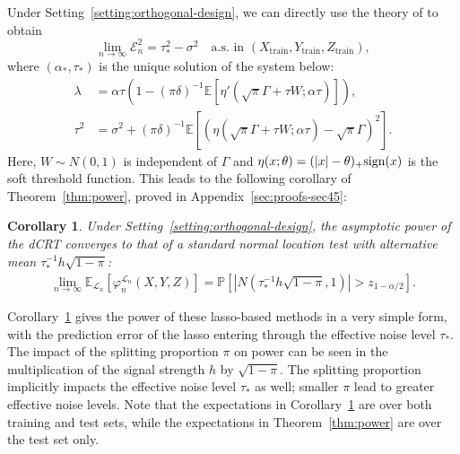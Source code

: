 \documentclass[ejs]{imsart}
\numberwithin{equation}{section}
\theoremstyle{plain}
\newtheorem{corollary}{Corollary}
\theoremstyle{definition}
\theoremstyle{remark}
\newcommand{\srx}{X}
\newcommand{\srz}{Z}
\newcommand{\sry}{Y}
\begin{document}
Under Setting~\ref{setting:orthogonal-design}, we can directly use the theory of \cite{Bayati2011} to obtain 
\begin{equation}
\lim_{n \rightarrow \infty}\mathcal E_n^2 = \tau_*^2 - \sigma^2 \quad \text{a.s. in } (\srx_{\text{train}}, \sry_{\text{train}}, \srz_{\text{train}}),
\label{eq:bm-result}
\end{equation}
where $(\alpha_*,\tau_*)$ is the unique solution of the system below:
\begin{equation}
	\begin{split}
		\lambda &= \alpha \tau (1-(\pi\delta)^{-1}\mathbb E[\eta'(\sqrt \pi \Gamma + \tau W; \alpha \tau)]), \\
		\tau^2 &= \sigma^2 + (\pi\delta)^{-1}\mathbb E[(\eta(\sqrt \pi\Gamma + \tau W; \alpha \tau) - \sqrt \pi\Gamma)^2].
	\end{split}
	\label{eq:amp-system}
\end{equation}
Here, $W \sim N(0,1)$ is independent of $\Gamma$ and $\eta(x; \theta) = (|x|-\theta)_+\textnormal{sign}(x)$ is the soft threshold function. This leads to the following corollary of Theorem~\ref{thm:power}, proved in Appendix~\ref{sec:proofs-sec45}:
\begin{corollary} \label{cor:lasso}
Under Setting~\ref{setting:orthogonal-design}, the asymptotic power of the dCRT converges to that of a standard normal location test with alternative mean $\tau_*^{-1} h\sqrt{1-\pi}$:
\begin{equation}
	\begin{split}
	\lim_{n \rightarrow \infty}\mathbb E_{\mathcal L_n}[\varphi^{\mathcal L_n}_{n}(\srx, \sry, \srz)] =  \mathbb P[|N(\tau_*^{-1} h\sqrt{1-\pi},1)| > z_{1-\alpha/2}].
	\label{eq:lasso-power}
	\end{split}
\end{equation}
\end{corollary}
Corollary~\ref{cor:lasso} gives the power of these lasso-based methods in a very simple form, with the prediction error of the lasso entering through the effective noise level $\tau_*$. The impact of the splitting proportion $\pi$ on power can be seen in the multiplication of the signal strength $h$ by $\sqrt{1-\pi}$. The splitting proportion implicitly impacts the effective noise level $\tau_*$ as well; smaller $\pi$ lead to greater effective noise levels. Note that the expectations in Corollary~\ref{cor:lasso} are over both training and test sets, while the expectations in Theorem~\ref{thm:power} are over the test set only. 
\end{document}
